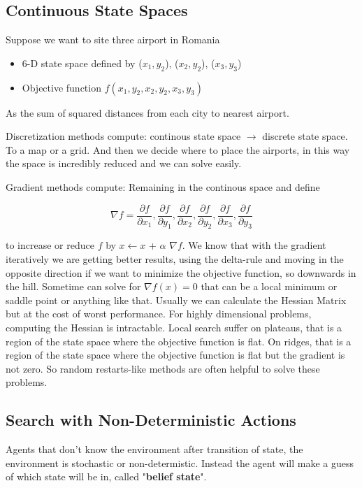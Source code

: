 \documentclass[12pt]{book}
\begin{document}
\subsection{Continuous State Spaces}
Suppose we want to site three airport in Romania
\begin{itemize}
	\item 6-D state space defined by ($x_1, y_2$), ($x_2, y_2$), ($x_3, y_3$)
	\item Objective function $f(x_1, y_2, x_2, y_2, x_3, y_3)$
\end{itemize}
As the sum of squared distances from each city to nearest airport.

Discretization methods compute: continous state space $\rightarrow$ discrete state space.
To a map or a grid. And then we decide where to place the airports, in this way the space is incredibly reduced and we can solve easily.

Gradient methods compute: Remaining in the continous space and define

\begin{equation}
	\nabla f = \frac{\partial f}{\partial x_1}, \frac{\partial f}{\partial y_1}, \frac{\partial f}{\partial x_2}, \frac{\partial f}{\partial y_2}, \frac{\partial f}{\partial x_3}, \frac{\partial f}{\partial y_3}
\end{equation}

to increase or reduce $f$ by $x \gets x$ + $\alpha$ $\nabla f$.
We know that with the gradient iteratively we are getting better results, using the delta-rule and moving in the opposite direction if we want to minimize the objective function, so downwards in the hill.\newline
Sometime can solve for $\nabla f(x) = 0$ that can be a local minimum or saddle point or anything like that.
\newline
Usually we can calculate the Hessian Matrix but at the cost of worst performance.
For highly dimensional problems, computing the Hessian is intractable. 
Local search suffer on plateaus, that is a region of the state space where the objective function is flat.
On ridges, that is a region of the state space where the objective function is flat but the gradient is not zero.
So random restarts-like methods are often helpful to solve these problems.

\subsection{Search with Non-Deterministic Actions}
Agents that don't know the environment after transition of state, the environment is stochastic or non-determistic.
Instead the agent will make a guess of which state will be in, called "\textbf{belief state}".
\end{document}
